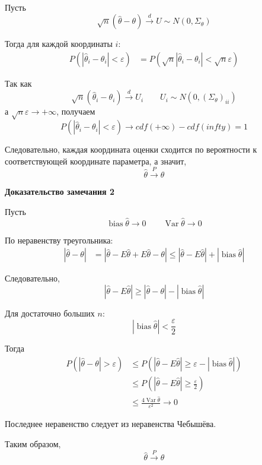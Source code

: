 \documentclass[12pt,a4paper]{article}
\begin{document}
\begin{proofbox}

Пусть
\[
\sqrt{n}(\hat{\theta}-\theta)
\xrightarrow{d}U\sim N(0,\Sigma_\theta)
\]

Тогда для каждой координаты $i$:
\[
\begin{aligned}
P(|\hat{\theta}_i-\theta_i|<\varepsilon)
&=
P\left(
\sqrt{n}|\hat{\theta}_i-\theta_i|
<
\sqrt{n}\varepsilon
\right)
\end{aligned}
\]

Так как
\[
\sqrt{n}(\hat{\theta}_i-\theta_i)
\xrightarrow{d}U_i
\qquad
U_i\sim N(0,(\Sigma_\theta)_{ii})
\]
а $\sqrt{n}\varepsilon\to+\infty$, получаем
\[
P(|\hat{\theta}_i-\theta_i|<\varepsilon)
\to
cdf(+\infty)-cdf(infty)=1
\]

Следовательно, каждая координата оценки сходится по вероятности к соответствующей координате параметра, а значит,
\[
\hat{\theta}\xrightarrow{P}\theta
\]

\end{proofbox}

\textbf{Доказательство замечания 2}

\begin{proofbox}

Пусть
\[
\operatorname{bias}\hat{\theta}\to0
\qquad
\operatorname{Var}\hat{\theta}\to0
\]

По неравенству треугольника:
\[
\begin{aligned}
|\hat{\theta}-\theta|
&=
|\hat{\theta}-E\hat{\theta}
+E\hat{\theta}-\theta|
\le
|\hat{\theta}-E\hat{\theta}|
+
|\operatorname{bias}\hat{\theta}|
\end{aligned}
\]

Следовательно,
\[
|\hat{\theta}-E\hat{\theta}|
\ge
|\hat{\theta}-\theta|
-
|\operatorname{bias}\hat{\theta}|
\]

Для достаточно больших $n$:
\[
|\operatorname{bias}\hat{\theta}|<\frac{\varepsilon}{2}
\]

Тогда
\[
\begin{aligned}
P(|\hat{\theta}-\theta|>\varepsilon)
&\le
P\left(
|\hat{\theta}-E\hat{\theta}|
\ge
\varepsilon-|\operatorname{bias}\hat{\theta}|
\right)\\
&\le
P\left(
|\hat{\theta}-E\hat{\theta}|
\ge\frac{\varepsilon}{2}
\right)\\
&\le
\frac{4\operatorname{Var}\hat{\theta}}{\varepsilon^2}
\to0
\end{aligned}
\]

Последнее неравенство следует из неравенства Чебышёва.

Таким образом,
\[
\hat{\theta}\xrightarrow{P}\theta
\]

\end{proofbox}
\end{document}
